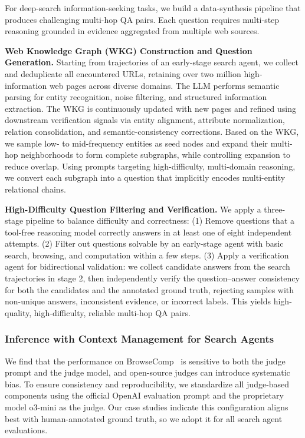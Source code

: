 For deep-search information-seeking tasks, we build a data-synthesis pipeline that produces challenging multi-hop QA pairs. Each question requires multi-step reasoning grounded in evidence aggregated from multiple web sources.

\textbf{Web Knowledge Graph (WKG) Construction and Question Generation.}
Starting from trajectories of an early-stage search agent, we collect and deduplicate all encountered URLs, retaining over two million high-information web pages across diverse domains. 
The LLM performs semantic parsing for entity recognition, noise filtering, and structured information extraction. 
The WKG is continuously updated with new pages and refined using downstream verification signals via entity alignment, attribute normalization, relation consolidation, and semantic-consistency corrections. 
Based on the WKG, we sample low- to mid-frequency entities as seed nodes and expand their multi-hop neighborhoods to form complete subgraphs, while controlling expansion to reduce overlap. 
Using prompts targeting high-difficulty, multi-domain reasoning, we convert each subgraph into a question that implicitly encodes multi-entity relational chains. 

\textbf{High-Difficulty Question Filtering and Verification.}
We apply a three-stage pipeline to balance difficulty and correctness:
(1) Remove questions that a tool-free reasoning model correctly answers in at least one of eight independent attempts.
(2) Filter out questions solvable by an early-stage agent with basic search, browsing, and computation within a few steps. 
(3) Apply a verification agent for bidirectional validation: we collect candidate answers from the search trajectories in stage 2, then independently verify the question–answer consistency for both the candidates and the annotated ground truth, rejecting samples with non-unique answers, inconsistent evidence, or incorrect labels. 
This yields high-quality, high-difficulty, reliable multi-hop QA pairs.

\subsubsection{Inference with Context Management for Search Agents}

We find that the performance on BrowseComp~\cite{wei2025browsecomp} is sensitive to both the judge prompt and the judge model, and open-source judges can introduce systematic bias. To ensure consistency and reproducibility, we standardize all judge-based components using the official OpenAI evaluation prompt and the proprietary model o3-mini as the judge. Our case studies indicate this configuration aligns best with human-annotated ground truth, so we adopt it for all search agent evaluations.

